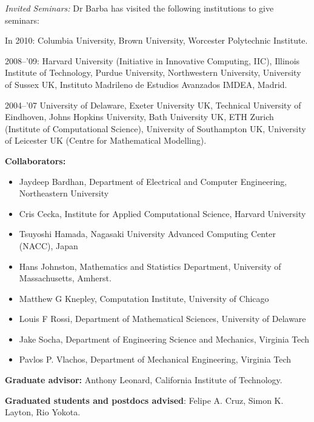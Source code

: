 \documentclass{proposalnsf}
\newlength{\up}
\newlength{\hup}
\begin{document}
\begin{list}{ }{\setlength{\leftmargin}{2.5em}}
	\item[\emph{Invited Seminars:}] Dr Barba has visited the following institutions to give seminars: \vspace{\hup}
\item[In 2010:] Columbia University, Brown University, Worcester Polytechnic Institute.\vspace{\hup}
\item[2008--'09:] Harvard University (Initiative in Innovative Computing, IIC), Illinois Institute of Technology, Purdue University, Northwestern University, University of Sussex UK, Instituto Madrileno de Estudios Avanzados IMDEA, Madrid.\vspace{\hup}
\item[2004--'07] University of Delaware, Exeter University UK, Technical University of Eindhoven, Johns Hopkins University,  Bath University UK, ETH Zurich (Institute of Computational Science), University of Southampton UK, University of Leicester UK (Centre for Mathematical Modelling). 
\end{list}


\textbf{Collaborators:} %
\vspace{\up}

\begin{itemize}
\item Jaydeep Bardhan, Department of Electrical and Computer Engineering, Northeastern University

\item Cris Cecka, Institute for Applied Computational Science, Harvard University

\item Tsuyoshi Hamada, Nagasaki University Advanced Computing Center (NACC), Japan
\item Hans Johnston, Mathematics and Statistics Department, University of Massachusetts, Amherst.
\item Matthew G Knepley, Computation Institute, University of Chicago

\item Louis F Rossi, Department of Mathematical Sciences, University of Delaware

\item Jake Socha, Department of Engineering Science and Mechanics, Virginia Tech
\item Pavlos P. Vlachos, Department of Mechanical Engineering, Virginia Tech
\end{itemize}

\textbf{Graduate advisor:} \quad Anthony Leonard, California Institute of Technology.

\textbf{Graduated students and postdocs advised}: Felipe A. Cruz, Simon K. Layton, Rio Yokota.

\end{document}
